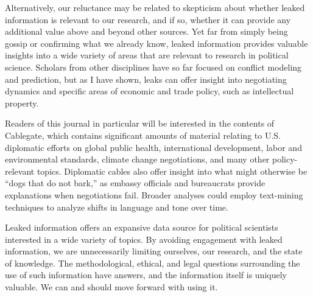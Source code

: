 \documentclass[12pt]{article}
\begin{document}
Alternatively, our reluctance may be related to skepticism about whether leaked information is relevant 
to our research, and if so, whether it can provide any additional value above and beyond other sources. 
Yet far from simply being gossip or confirming what we already know, leaked information provides 
valuable insights into a wide variety of areas that are relevant to research in political science. 
Scholars from other disciplines have so far focused on conflict modeling and prediction, but as I 
have shown, leaks can offer insight into negotiating dynamics and specific areas of economic and 
trade policy, such as intellectual property.

Readers of this journal in particular will be interested in the contents of Cablegate, which contains 
significant amounts of material relating to U.S. diplomatic efforts on global public health, international 
development, labor and environmental standards, climate change negotiations, and many other policy-relevant topics. 
Diplomatic cables also offer insight into what might otherwise be ``dogs that do not bark,'' as embassy officials and 
bureaucrats provide explanations when negotiations fail.
Broader analyses could employ text-mining techniques to analyze shifts in language and tone over time.

Leaked information offers an expansive data source for political scientists interested in a wide variety of topics. 
By avoiding engagement with leaked information, we are unnecessarily limiting ourselves, our research, and 
the state of knowledge. The methodological, ethical, and legal questions surrounding the use of such information 
have answers, and the information itself is uniquely valuable. We can and should move forward with using it.


\theendnotes



\end{document}
